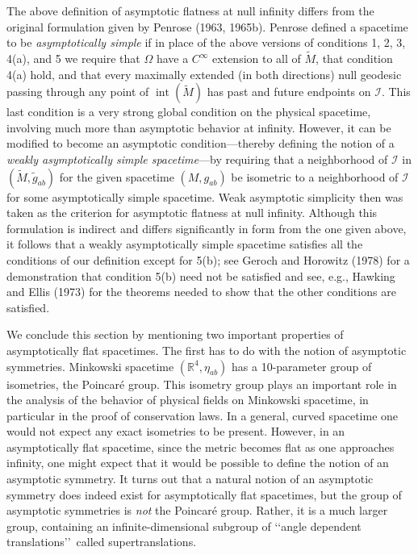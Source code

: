 The above definition of asymptotic flatness at null infinity differs from the original
formulation given by Penrose (1963, 1965b). Penrose defined a spacetime to be
\emph{asymptotically simple} if in place of the above versions of conditions 1, 2, 3,
4(a), and 5 we require that \(\Omega\) have a \(C^\infty\) extension to all of
\(\tilde M\), that condition 4(a) hold, and that every maximally extended (in both
directions) null geodesic passing through any point of \(\operatorname{int}(\tilde M)\)
has past and future endpoints on \(\mathcal I\). This last condition is a very strong
global condition on the physical spacetime, involving much more than asymptotic
behavior at infinity. However, it can be modified to become an asymptotic
condition---thereby defining the notion of a \emph{weakly asymptotically simple
spacetime}---by requiring that a neighborhood of \(\mathcal I\) in
\((\tilde M,\tilde g_{ab})\) for the given spacetime \((M,g_{ab})\) be isometric to a
neighborhood of \(\mathcal I\) for some asymptotically simple spacetime. Weak
asymptotic simplicity then was taken as the criterion for asymptotic flatness at null
infinity. Although this formulation is indirect and differs significantly in form from
the one given above, it follows that a weakly asymptotically simple spacetime
satisfies all the conditions of our definition except for 5(b); see Geroch and
Horowitz (1978) for a demonstration that condition 5(b) need not be satisfied and
see, e.g., Hawking and Ellis (1973) for the theorems needed to show that the other
conditions are satisfied.

We conclude this section by mentioning two important properties of asymptotically
flat spacetimes. The first has to do with the notion of asymptotic symmetries.
Minkowski spacetime \((\mathbb R^4,\eta_{ab})\) has a 10-parameter group of
isometries, the Poincar\'e group. This isometry group plays an important role in the
analysis of the behavior of physical fields on Minkowski spacetime, in particular in
the proof of conservation laws. In a general, curved spacetime one would not expect
any exact isometries to be present. However, in an asymptotically flat spacetime,
since the metric becomes flat as one approaches infinity, one might expect that it
would be possible to define the notion of an asymptotic symmetry. It turns out that
a natural notion of an asymptotic symmetry does indeed exist for asymptotically flat
spacetimes, but the group of asymptotic symmetries is \emph{not} the Poincar\'e
group. Rather, it is a much larger group, containing an infinite-dimensional subgroup
of \lq\lq angle dependent translations\rq\rq\ called supertranslations.

